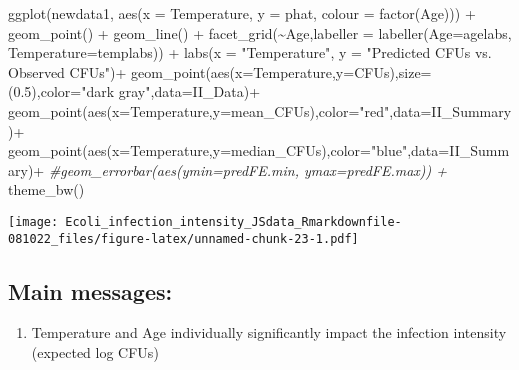 \documentclass[
]{article}
\newenvironment{Shaded}{\begin{snugshade}}{\end{snugshade}}
\newcommand{\AttributeTok}[1]{\textcolor[rgb]{0.77,0.63,0.00}{#1}}
\newcommand{\CommentTok}[1]{\textcolor[rgb]{0.56,0.35,0.01}{\textit{#1}}}
\newcommand{\FloatTok}[1]{\textcolor[rgb]{0.00,0.00,0.81}{#1}}
\newcommand{\FunctionTok}[1]{\textcolor[rgb]{0.00,0.00,0.00}{#1}}
\newcommand{\NormalTok}[1]{#1}
\newcommand{\SpecialCharTok}[1]{\textcolor[rgb]{0.00,0.00,0.00}{#1}}
\newcommand{\StringTok}[1]{\textcolor[rgb]{0.31,0.60,0.02}{#1}}
\providecommand{\tightlist}{%
  \setlength{\itemsep}{0pt}\setlength{\parskip}{0pt}}
\begin{document}
\begin{Shaded}
\begin{Highlighting}[]
\FunctionTok{ggplot}\NormalTok{(newdata1, }\FunctionTok{aes}\NormalTok{(}\AttributeTok{x =}\NormalTok{ Temperature, }\AttributeTok{y =}\NormalTok{ phat, }\AttributeTok{colour =} \FunctionTok{factor}\NormalTok{(Age))) }\SpecialCharTok{+}
  \FunctionTok{geom\_point}\NormalTok{() }\SpecialCharTok{+}
  \FunctionTok{geom\_line}\NormalTok{() }\SpecialCharTok{+}
  \FunctionTok{facet\_grid}\NormalTok{(}\SpecialCharTok{\textasciitilde{}}\NormalTok{Age,}\AttributeTok{labeller =} \FunctionTok{labeller}\NormalTok{(}\AttributeTok{Age=}\NormalTok{agelabs, }\AttributeTok{Temperature=}\NormalTok{templabs)) }\SpecialCharTok{+}
  \FunctionTok{labs}\NormalTok{(}\AttributeTok{x =} \StringTok{"Temperature"}\NormalTok{, }\AttributeTok{y =} \StringTok{"Predicted CFUs vs. Observed CFUs"}\NormalTok{)}\SpecialCharTok{+}
  \FunctionTok{geom\_point}\NormalTok{(}\FunctionTok{aes}\NormalTok{(}\AttributeTok{x=}\NormalTok{Temperature,}\AttributeTok{y=}\NormalTok{CFUs),}\AttributeTok{size=}\NormalTok{(}\FloatTok{0.5}\NormalTok{),}\AttributeTok{color=}\StringTok{"dark gray"}\NormalTok{,}\AttributeTok{data=}\NormalTok{II\_Data)}\SpecialCharTok{+}
  \FunctionTok{geom\_point}\NormalTok{(}\FunctionTok{aes}\NormalTok{(}\AttributeTok{x=}\NormalTok{Temperature,}\AttributeTok{y=}\NormalTok{mean\_CFUs),}\AttributeTok{color=}\StringTok{"red"}\NormalTok{,}\AttributeTok{data=}\NormalTok{II\_Summary)}\SpecialCharTok{+}
  \FunctionTok{geom\_point}\NormalTok{(}\FunctionTok{aes}\NormalTok{(}\AttributeTok{x=}\NormalTok{Temperature,}\AttributeTok{y=}\NormalTok{median\_CFUs),}\AttributeTok{color=}\StringTok{"blue"}\NormalTok{,}\AttributeTok{data=}\NormalTok{II\_Summary)}\SpecialCharTok{+}
  \CommentTok{\#geom\_errorbar(aes(ymin=predFE.min, ymax=predFE.max)) +}
  \FunctionTok{theme\_bw}\NormalTok{()}
\end{Highlighting}
\end{Shaded}

\texttt{[image: Ecoli\_infection\_intensity\_JSdata\_Rmarkdownfile-081022\_files/figure-latex/unnamed-chunk-23-1.pdf]}

\hypertarget{main-messages}{%
\subsection{Main messages:}\label{main-messages}}

\begin{enumerate}
\def\labelenumi{\arabic{enumi})}
\tightlist
\item
  Temperature and Age individually significantly impact the infection
  intensity (expected log CFUs)
\end{enumerate}
\end{document}
